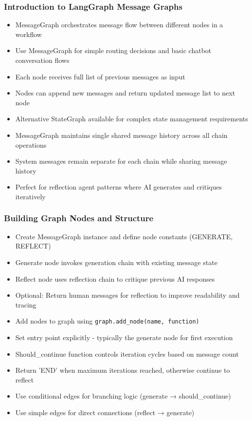\begin{frame}[fragile]\frametitle{Introduction to LangGraph Message Graphs}
      \begin{itemize}
	\item MessageGraph orchestrates message flow between different nodes in a workflow
	\item Use MessageGraph for simple routing decisions and basic chatbot conversation flows
	\item Each node receives full list of previous messages as input
	\item Nodes can append new messages and return updated message list to next node
	\item Alternative StateGraph available for complex state management requirements
	\item MessageGraph maintains single shared message history across all chain operations
	\item System messages remain separate for each chain while sharing message history
	\item Perfect for reflection agent patterns where AI generates and critiques iteratively
	  \end{itemize}
\end{frame}

\begin{frame}[fragile]\frametitle{Building Graph Nodes and Structure}
      \begin{itemize}
	\item Create MessageGraph instance and define node constants (GENERATE, REFLECT)
	\item Generate node invokes generation chain with existing message state
	\item Reflect node uses reflection chain to critique previous AI responses
	\item Optional: Return human messages for reflection to improve readability and tracing
	\item Add nodes to graph using \texttt{graph.add\_node(name, function)}
	\item Set entry point explicitly - typically the generate node for first execution
	\item Should\_continue function controls iteration cycles based on message count
	\item Return 'END' when maximum iterations reached, otherwise continue to reflect
	\item Use conditional edges for branching logic (generate → should\_continue)
	\item Use simple edges for direct connections (reflect → generate)
	  \end{itemize}
\end{frame}

